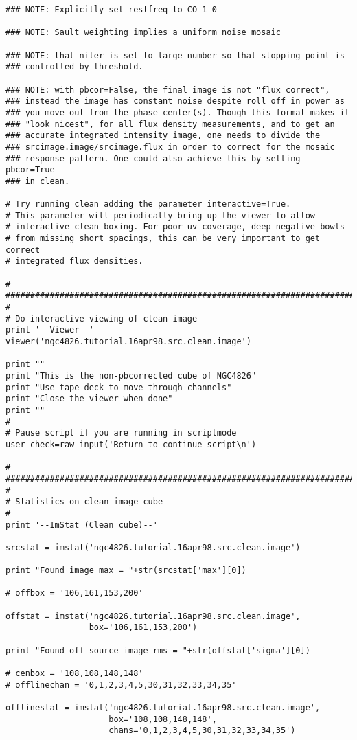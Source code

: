 \begin{verbatim}
### NOTE: Explicitly set restfreq to CO 1-0

### NOTE: Sault weighting implies a uniform noise mosaic 

### NOTE: that niter is set to large number so that stopping point is
### controlled by threshold.

### NOTE: with pbcor=False, the final image is not "flux correct",
### instead the image has constant noise despite roll off in power as
### you move out from the phase center(s). Though this format makes it
### "look nicest", for all flux density measurements, and to get an
### accurate integrated intensity image, one needs to divide the
### srcimage.image/srcimage.flux in order to correct for the mosaic
### response pattern. One could also achieve this by setting pbcor=True
### in clean.

# Try running clean adding the parameter interactive=True.
# This parameter will periodically bring up the viewer to allow
# interactive clean boxing. For poor uv-coverage, deep negative bowls
# from missing short spacings, this can be very important to get correct
# integrated flux densities.

#
##########################################################################
#
# Do interactive viewing of clean image
print '--Viewer--'
viewer('ngc4826.tutorial.16apr98.src.clean.image')

print ""
print "This is the non-pbcorrected cube of NGC4826"
print "Use tape deck to move through channels"
print "Close the viewer when done"
print ""
#
# Pause script if you are running in scriptmode
user_check=raw_input('Return to continue script\n')

#
##########################################################################
#
# Statistics on clean image cube
#
print '--ImStat (Clean cube)--'

srcstat = imstat('ngc4826.tutorial.16apr98.src.clean.image')

print "Found image max = "+str(srcstat['max'][0])

# offbox = '106,161,153,200'

offstat = imstat('ngc4826.tutorial.16apr98.src.clean.image',
                 box='106,161,153,200')

print "Found off-source image rms = "+str(offstat['sigma'][0])

# cenbox = '108,108,148,148'
# offlinechan = '0,1,2,3,4,5,30,31,32,33,34,35'

offlinestat = imstat('ngc4826.tutorial.16apr98.src.clean.image',
                     box='108,108,148,148',
                     chans='0,1,2,3,4,5,30,31,32,33,34,35')


\end{verbatim}
